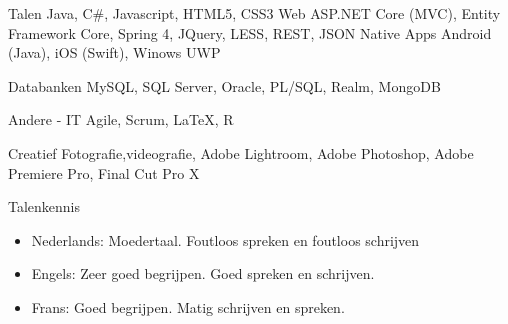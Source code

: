 


\begin{cvskills}


\cvskill
{Talen}
{Java, C\#, Javascript, HTML5, CSS3}
\cvskill
{Web }
{ASP.NET Core (MVC), Entity Framework Core, Spring 4, JQuery, LESS, REST, JSON}
\cvskill
{Native Apps}
{Android (Java), iOS (Swift), Winows UWP}

\cvskill
{Databanken}
{MySQL, SQL Server, Oracle, PL/SQL, Realm, MongoDB}

\cvskill
{Andere - IT}
{Agile, Scrum, LaTeX, R}

\cvskill
{Creatief} %
{Fotografie,videografie, Adobe Lightroom, Adobe Photoshop, Adobe Premiere Pro, Final Cut Pro X} %





\cvskill
{Talenkennis} %
{
\begin{itemize}
\item {Nederlands: Moedertaal. Foutloos spreken en foutloos schrijven }
\item Engels: Zeer goed begrijpen. Goed spreken en schrijven.
\item Frans: Goed begrijpen. Matig schrijven en spreken.
\end{itemize}
} %


\end{cvskills}